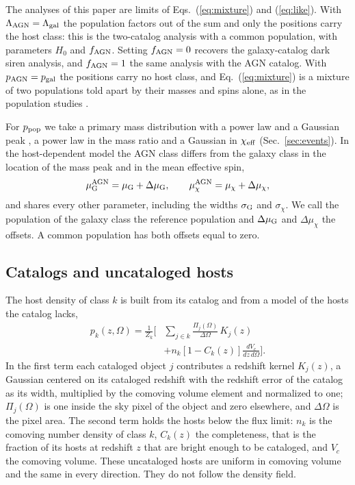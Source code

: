 \documentclass[aps,prd,reprint,twocolumn,superscriptaddress,nofootinbib,floatfix]{revtex4-2}
\newcommand{\chieff}{\chi_{\rm eff}}
\newcommand{\fagn}{f_{\rm AGN}}
\newcommand{\dmuG}{\Delta\mu_{\rm G}}
\newcommand{\dmuchi}{\Delta\mu_\chi}
\begin{document}
The analyses of this paper are limits of Eqs.~(\ref{eq:mixture}) and
(\ref{eq:like}). With $\Lambda_{\rm AGN}=\Lambda_{\rm gal}$ the population
factors out of the sum and only the positions carry the host class: this is
the two-catalog analysis with a common population, with parameters $H_0$ and
$\fagn$. Setting $\fagn=0$ recovers the galaxy-catalog dark siren analysis,
and $\fagn=1$ the same analysis with the AGN catalog. With $p_{\rm
AGN}=p_{\rm gal}$ the positions carry no host class, and
Eq.~(\ref{eq:mixture}) is a mixture of two populations told apart by their
masses and spins alone, as in the population studies
\cite{Gayathri:2023bha,Bartos:2026xlt}.

For $p_{\rm pop}$ we take a primary mass distribution with a power law and a
Gaussian peak \cite{Talbot:2018cva}, a power law in the mass ratio and a
Gaussian in $\chieff$ (Sec.~\ref{sec:events}). In the
host-dependent model the AGN class differs from the galaxy class in the
location of the mass peak and in the mean effective spin,
\begin{equation}
\mu_{\rm G}^{\rm AGN}=\mu_{\rm G}+\dmuG ,\qquad
\mu_\chi^{\rm AGN}=\mu_\chi+\dmuchi ,
\label{eq:offsets}
\end{equation}
and shares every other parameter, including the widths $\sigma_{\rm G}$ and
$\sigma_\chi$. We call the population of the galaxy class the reference
population and $\dmuG$ and $\dmuchi$ the offsets. A common population has
both offsets equal to zero.

\subsection{Catalogs and uncataloged hosts}
\label{sec:hosts}

The host density of class $k$ is built from its catalog and from a model of
the hosts the catalog lacks,
\begin{equation}
\begin{split}
p_k(z,\Omega)=\frac{1}{Z_k}\bigg[&\sum_{j\in k}\frac{\Pi_j(\Omega)}{\Delta\Omega}\,K_j(z)\\
&+n_k\left[1-C_k(z)\right]\frac{dV_c}{dz\,d\Omega}\bigg] .
\end{split}
\label{eq:hosts}
\end{equation}
In the first term each cataloged object $j$ contributes a redshift kernel
$K_j(z)$, a Gaussian centered on its cataloged redshift with the redshift
error of the catalog as its width, multiplied by the comoving volume element
and normalized to one; $\Pi_j(\Omega)$ is one inside the sky pixel of the
object and zero elsewhere, and $\Delta\Omega$ is the pixel area. The second
term holds the hosts below the flux limit: $n_k$ is the comoving number
density of class $k$, $C_k(z)$ the completeness, that is the fraction of its
hosts at redshift $z$ that are bright enough to be cataloged, and $V_c$ the
comoving volume. These uncataloged hosts are uniform in comoving volume and
the same in every direction. They do not follow the density field.
\end{document}
